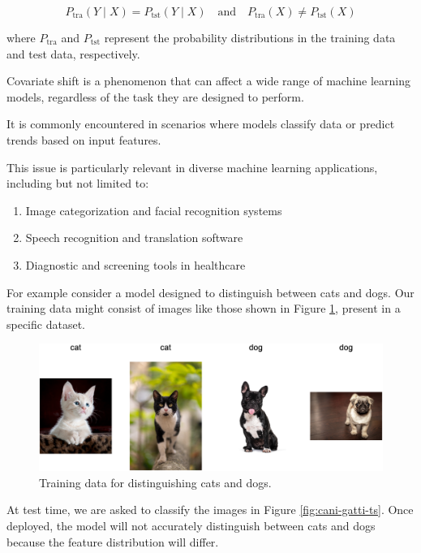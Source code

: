 	$$
	P_{\text{tra}}(Y \mid X) = P_{\text{tst}}(Y \mid X) \quad \text{and} \quad P_{\text{tra}}(X) \neq P_{\text{tst}}(X)
	$$

	where $P_{\text{tra}}$ and $P_{\text{tst}}$ represent the probability distributions in the training data and test data, respectively.  
	\vspace{0.5cm}  
	
Covariate shift is a phenomenon that can affect a wide range of machine learning models, regardless of the task they are designed to perform.

It is commonly encountered in scenarios where models classify data or predict trends based on input features.

This issue is particularly relevant in diverse machine learning applications, including but not limited to:
	
	\begin{enumerate}
		\item Image categorization and facial recognition systems
		\item Speech recognition and translation software
		\item Diagnostic and screening tools in healthcare
	\end{enumerate}
	
For example consider a model designed to distinguish between cats and dogs. Our training data might consist of images like those shown in Figure \ref{fig:cani-gatti-tr}, present in a specific dataset.
	
	\vspace{1cm}
	\begin{figure}[H]
		\centering
		\includegraphics[width=1\textwidth]{assets/cat-dog-train.png} 
		\caption{Training data for distinguishing cats and dogs.}
		\label{fig:cani-gatti-tr}
	\end{figure}
     \vspace{1cm}
     

At test time, we are asked to classify the images in Figure \ref{fig:cani-gatti-ts}. Once deployed, the model will not accurately distinguish between cats and dogs because the feature distribution will differ.

